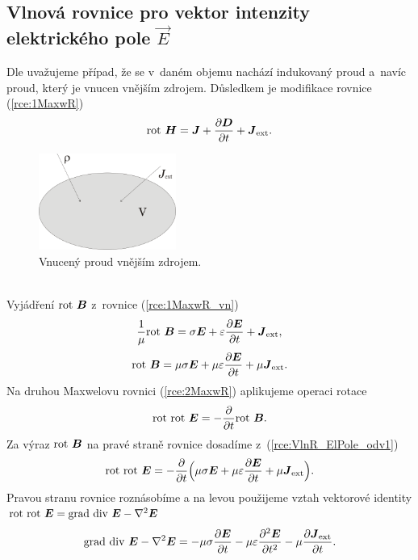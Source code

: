 \subsection{Vlnová rovnice pro vektor intenzity elektrického pole $\vec E$}
Dle \cite[str. 33]{emp} uvažujeme případ, že se v~daném objemu nachází indukovaný proud a~navíc proud, který je vnucen vnějším zdrojem. Důsledkem je modifikace rovnice (\ref{rce:1MaxwR})
\begin{equation}
	\mathrm{rot}\ \mbox{\boldmath$H$} = \mbox{\boldmath$J$}+\frac{\partial\mbox{\boldmath$D$}}{\partial t}+\mbox{\boldmath$J$}_{\mathrm{ext}}.
	\label{rce:1MaxwR_vn}
\end{equation}
\begin{figure}[!h]
	\centering
	\includegraphics[width=4.5cm]{vnuceny_I.png}
	\caption{Vnucený proud vnějším zdrojem.}
	\label{obr:vnuceny_I}
\end{figure}\\
Vyjádření $\mathrm{rot}\ \mbox{\boldmath$B$}$ z~rovnice (\ref{rce:1MaxwR_vn})
\begin{displaymath}
	\frac{1}{\mu} \mathrm{rot}\ \mbox{\boldmath$B$} = \sigma \mbox{\boldmath$E$}+\varepsilon\frac{\partial\mbox{\boldmath$E$}}{\partial t}+\mbox{\boldmath$J$}_{\mathrm{ext}},
\end{displaymath}
\begin{equation}
	\mathrm{rot}\ \mbox{\boldmath$B$} = \mu\sigma\mbox{\boldmath$E$}+\mu\varepsilon\frac{\partial\mbox{\boldmath$E$}}{\partial t}+\mu\mbox{\boldmath$J$}_{\mathrm{ext}}.
	\label{rce:VlnR_ElPole_odv1}
\end{equation}
Na druhou Maxwelovu rovnici (\ref{rce:2MaxwR}) aplikujeme operaci rotace
\begin{displaymath}
	\mathrm{rot}\ \mathrm{rot}\ \mbox{\boldmath$E$} = -\frac{\partial}{\partial t}\mathrm{rot}\ \mbox{\boldmath$B$}.
\end{displaymath}
Za výraz $\mathrm{rot}\ \mbox{\boldmath$B$}$ na pravé straně rovnice dosadíme z~(\ref{rce:VlnR_ElPole_odv1})
\begin{displaymath}
	\mathrm{rot}\ \mathrm{rot}\ \mbox{\boldmath$E$} = -\frac{\partial}{\partial t}\Big(\mu\sigma\mbox{\boldmath$E$}+\mu\varepsilon\frac{\partial\mbox{\boldmath$E$}}{\partial t}+\mu\mbox{\boldmath$J$}_{\mathrm{ext}}\Big).
\end{displaymath}
Pravou stranu rovnice roznásobíme a na levou použijeme vztah vektorové identity $\mathrm{rot}\ \mathrm{rot}\ \mbox{\boldmath$E$} = \mathrm{grad}\ \mathrm{div}\ \mbox{\boldmath$E$} - \nabla^{2}\mbox{\boldmath$E$}$ 
\begin{displaymath}
	\mathrm{grad}\ \mathrm{div}\ \mbox{\boldmath$E$} - \nabla^{2}\mbox{\boldmath$E$} = -\mu\sigma\frac{\partial\mbox{\boldmath$E$}}{\partial t}-\mu\varepsilon\frac{\partial^{2}\mbox{\boldmath$E$}}{\partial t^{2}}-\mu\frac{\partial\mbox{\boldmath$J$}_{\mathrm{ext}}}{\partial t}.
\end{displaymath}
